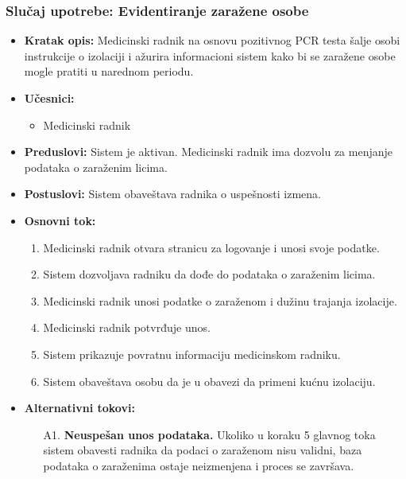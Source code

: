 \documentclass[titlepage]{article}
\begin{document}
\subsubsection{Slučaj upotrebe: Evidentiranje zaražene osobe}
\begin{itemize}
    \item \textbf{Kratak opis:} Medicinski radnik na osnovu pozitivnog PCR testa šalje osobi instrukcije o izolaciji i ažurira informacioni sistem kako bi se zaražene osobe mogle pratiti u narednom periodu.
    \item \textbf{Učesnici:}
        \begin{itemize}
            \item Medicinski radnik
        \end{itemize}
    \item \textbf{Preduslovi:} Sistem je aktivan. Medicinski radnik ima dozvolu za menjanje podataka o zaraženim licima.
    \item \textbf{Postuslovi:} Sistem obaveštava radnika o uspešnosti izmena.
    \item \textbf{Osnovni tok:}
    \begin{enumerate}
        \item Medicinski radnik otvara stranicu za logovanje i unosi svoje podatke.
        \item Sistem dozvoljava radniku da dođe do podataka o zaraženim licima.
        \item Medicinski radnik unosi podatke o zaraženom i dužinu trajanja izolacije.
        \item Medicinski radnik potvrđuje unos.
        \item Sistem prikazuje povratnu informaciju medicinskom radniku.
        \item Sistem obaveštava osobu da je u obavezi da primeni kućnu izolaciju.
    \end{enumerate}
    \item\textbf{Alternativni tokovi:}
        \begin{itemize}
            \item [A1.] \textbf{Neuspešan unos podataka.} Ukoliko u koraku 5 glavnog toka sistem obavesti radnika da podaci o zaraženom nisu validni, baza podataka o zaraženima ostaje neizmenjena i proces se završava.
        \end{itemize}
\end{itemize}
\end{document}
